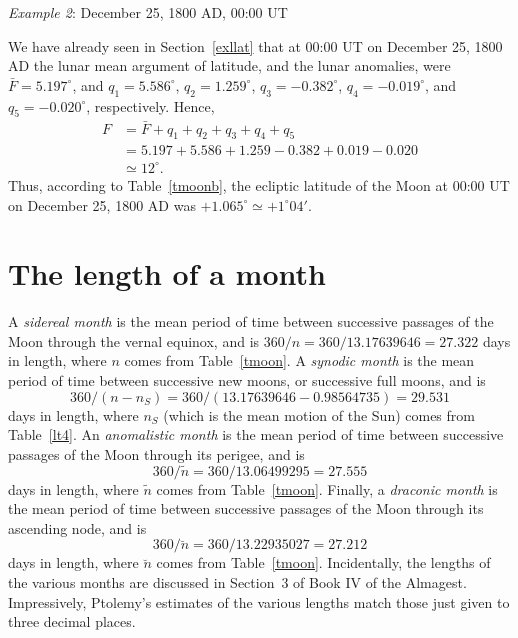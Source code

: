 \begin{center}
{\em Example 2}: December 25, 1800 AD, 00:00 UT
\end{center}
We have already seen in Section~\ref{exllat} that at 00:00 UT on December 25, 1800 AD
the lunar mean argument of latitude, and
the lunar anomalies, were $\bar{F}=5.197^\circ$, and
$q_1=5.586^\circ$, $q_2=1.259^\circ$, $q_3=-0.382^\circ$, $q_4=-0.019^\circ$,
and $q_5=-0.020^\circ$, respectively. Hence, 
\begin{align*}
F&=\bar{F}+q_1+q_2+q_3+q_4+q_5\\[0.5ex]
&=5.197+5.586+1.259-0.382+0.019-0.020\\[0.5ex]
&\simeq 12^\circ.
\end{align*}
 Thus, according to Table~\ref{tmoonb}, the ecliptic latitude
of the Moon at  00:00 UT on December 25, 1800 AD was $+1.065^\circ\simeq +1^\circ 04'$.

\section{The length of  a month}
A {\em sidereal month}\/ is the mean period of time between successive passages of the Moon through the vernal equinox, and is
$360/n= 360/13.17639646=27.322$ days in length, where $n$ comes from Table~\ref{tmoon}. A {\em synodic month}\/ is the mean period of time between successive new moons, or
successive full moons, and is $$360/(n-n_S)= 360/(13.17639646-0.98564735)=29.531$$ days in length, where $n_S$ (which is the mean motion of the Sun) comes from Table~\ref{lt4}. 
An {\em anomalistic month}\/ is the mean period of time between successive passages of the Moon through its perigee, and is $$360/\tilde{n}=360/13.06499295=27.555$$ days
in length, where $\tilde{n}$ comes from Table~\ref{tmoon}. Finally, a {\em draconic month}\/ is the mean period of time between successive passages of the Moon
through its ascending node, and is $$360/\breve{n} =360/13.22935027 = 27.212$$ days in length, where $\breve{n}$ comes from Table~\ref{tmoon}. 
Incidentally, the lengths of the various months are discussed in Section~3 of Book IV of the Almagest. Impressively, Ptolemy's estimates of the various lengths
match those just given to three decimal places. 


